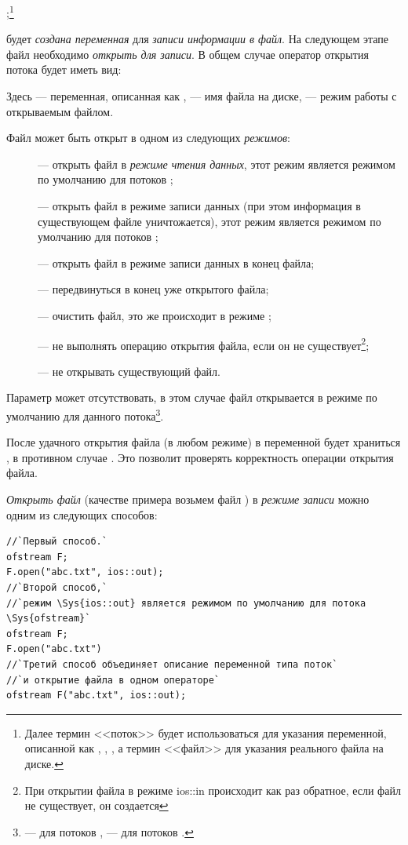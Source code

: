 ;\footnote{Далее термин <<поток>> будет использоваться для указания переменной,
описанной как , , , а термин <<файл>> для указания реального файла на диске.}

будет \emph{создана переменная}  для \emph{записи
информации в файл}. На следующем этапе файл необходимо
\emph{открыть для записи}. В общем случае оператор открытия потока
будет иметь вид:


Здесь  --- переменная, описанная как ,  --- имя файла
на диске,  --- режим работы с открываемым файлом. 

Файл может быть открыт в одном из следующих \emph{режимов}:
\begin{description}
\item[] --- открыть файл в \emph{режиме чтения данных}, этот режим является режимом по
умолчанию для потоков ;
\item[] --- открыть файл в режиме записи данных (при этом информация в существующем файле
уничтожается), этот режим является режимом по умолчанию для потоков ;
\item[] --- открыть файл в режиме записи данных в конец файла;
\item[] --- передвинуться в конец уже открытого файла;
\item[] --- очистить файл, это же происходит в режиме ;
\item[] --- не выполнять операцию открытия файла, если он не существует\footnote{При открытии
файла в режиме ios::in происходит как раз обратное, если файл не существует, он создается}; 
\item[] --- не открывать существующий файл.
\end{description}
Параметр  может отсутствовать, в этом случае файл открывается в режиме по умолчанию для данного
потока\footnote{ --- для потоков ,  --- для потоков .}.

После удачного открытия файла (в любом режиме) в переменной  будет храниться
, в противном случае . Это позволит проверять корректность операции
открытия файла.

\emph{Открыть файл} (качестве примера возьмем файл ) в \emph{режиме
записи} можно одним из следующих способов:
\begin{lstlisting}
//`Первый способ.`
ofstream F;			
F.open("abc.txt", ios::out);
//`Второй способ,` 
//`режим \Sys{ios::out} является режимом по умолчанию для потока \Sys{ofstream}`
ofstream F; 
F.open("abc.txt")
//`Третий способ объединяет описание переменной типа поток` 
//`и открытие файла в одном операторе`
ofstream F("abc.txt", ios::out);
\end{lstlisting}

